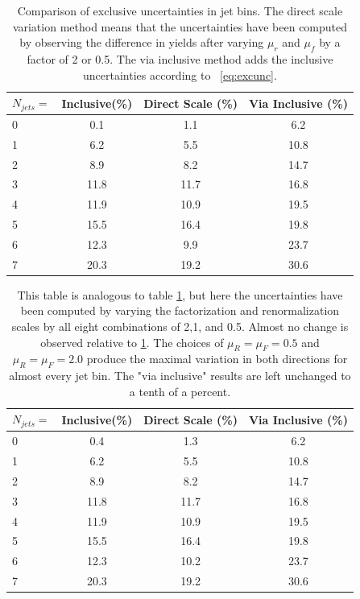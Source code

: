 \documentclass[oneside, letterpaper, oldfontcommands]{memoir}
\begin{document}
\begin{table}[hbtp]
 \centering  
 \caption{Comparison of exclusive uncertainties in jet bins. The direct scale variation method means that the uncertainties have been computed by observing the difference in yields after varying $\mu_{r}$ and $\mu_{f}$ by a factor of 2 or 0.5. The via inclusive method adds the inclusive uncertainties according to ~\ref{eq:excunc}.}
  \label{tab:JetUncTable}
  
      \begin{tabular}{l|c|c|c} \hline
    $N_{jets} =$       &Inclusive(\%)   &  Direct Scale (\%)    & Via Inclusive (\%) \\ \hline
    0                  & 0.1   & 1.1  & 6.2 \\
    1                  & 6.2   & 5.5  & 10.8\\
    2                  & 8.9   & 8.2  & 14.7\\
    3                  & 11.8  & 11.7 & 16.8\\
    4                  & 11.9  & 10.9 & 19.5\\
    5                  & 15.5  & 16.4 & 19.8\\
    6                  & 12.3  & 9.9  & 23.7\\
    7                  & 20.3  & 19.2 & 30.6\\
  \hline
  \end{tabular}
  \end{table}
  
   \begin{table}[hbtp]
 \centering  
 \caption{This table is analogous to table \ref{tab:JetUncTable}, but here the uncertainties have been computed by varying the factorization and renormalization scales by all eight combinations of 2,1, and 0.5. Almost no change is observed relative to \ref{tab:JetUncTable}. The choices of $\mu_{R} = \mu_{F} = 0.5$ and $\mu_{R} = \mu_{F} = 2.0$ produce the maximal variation in both directions for almost every jet bin. The "via inclusive" results are left unchanged to a tenth of a percent.}
  \label{tab:JetUncTableDoubleHalf}
  \begin{tabular}{l|c|c|c} \hline
    $N_{jets} =$       &Inclusive(\%)   &  Direct Scale (\%)    & Via Inclusive (\%) \\ \hline
    0                  & 0.4   & 1.3  & 6.2 \\
    1                  & 6.2   & 5.5  & 10.8\\
    2                  & 8.9   & 8.2  & 14.7\\
    3                  & 11.8  & 11.7 & 16.8\\
    4                  & 11.9  & 10.9 & 19.5\\
    5                  & 15.5  & 16.4 & 19.8\\
    6                  & 12.3  & 10.2  & 23.7\\
    7                  & 20.3  & 19.2 & 30.6\\
  \hline
  \end{tabular}
  

\end{table}
\end{document}
